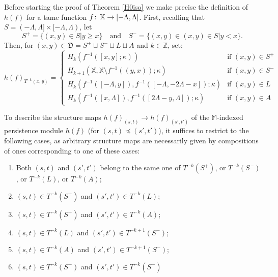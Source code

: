 \documentclass[11pt]{amsart}
\theoremstyle{definition}
\theoremstyle{remark}
\numberwithin{equation}{section}
\def\co{\colon\thinspace}
\def\Z{\mathbb{Z}}
\begin{document}
Before starting the proof of Theorem \ref{H0iso} we make precise the definition of $h(f)$ for a tame function $f\co \mathbb{X}\to [-\Lambda,\Lambda]$.  First, recalling that $S=(-\Lambda,\Lambda]\times[-\Lambda,\Lambda)$, let \[ S^+=\{(x,y)\in S|y\geq x\}\quad \mbox{and}\quad S^-=\{(x,y)\in (x,y)\in S|y<x\}. \]  Then, for $(x,y)\in \mathfrak{D}=S^+\sqcup S^-\sqcup L\sqcup A$ and $k\in \Z$, set: 
\[ 
h(f)_{T^{-k}(x,y)}=\left\{\begin{array}{ll} H_k(f^{-1}([x,y];\kappa)) & \mbox{if }(x,y)\in S^+ \\ H_{k+1}(\mathbb{X},\mathbb{X}\setminus f^{-1}((y,x));\kappa) & \mbox{if }(x,y)\in S^- \\ H_k(f^{-1}([-\Lambda,y]),f^{-1}([-\Lambda,-2\Lambda-x]);\kappa) & \mbox{if }(x,y)\in L \\ H_k(f^{-1}([x,\Lambda]),f^{-1}([2\Lambda-y,\Lambda]);\kappa) & \mbox{if }(x,y)\in A \end{array}\right.
\]

To describe the structure maps $h(f)_{(s,t)}\to h(f)_{(s',t')}$ of the $\mathbb{M}$-indexed persistence module $h(f)$ (for $(s,t)\preceq (s',t')$), it suffices to restrict to the following cases, as arbitrary structure maps are necessarily given by compositions of ones corresponding to one of these cases:
\begin{enumerate} \item \label{same} Both $(s,t)$ and $(s',t')$ belong to the same one of $T^{-k}(S^+)$, or $T^{-k}(S^-)$, or $T^{-k}(L)$, or $T^{-k}(A)$;
	\item \label{S+L} $(s,t)\in T^{-k}(S^+)$ and $(s',t')\in T^{-k}(L)$; \item \label{S+A} $(s,t)\in T^{-k}(S^+)$ and $(s',t')\in T^{-k}(A)$;
	\item \label{LS-} $(s,t)\in T^{-k}(L)$ and $(s',t')\in T^{-k+1}(S^-)$;
	\item \label{AS-} $(s,t)\in T^{-k}(A)$ and $(s',t')\in T^{-k+1}(S^-)$; 
	\item \label{S-S+} $(s,t)\in T^{-k}(S^-)$ and $(s',t')\in T^{-k}(S^+)$
\end{enumerate} 
 
\end{document}
